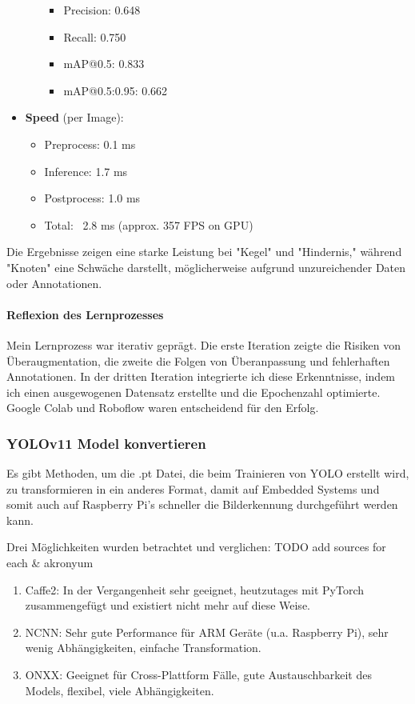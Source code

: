\begin{itemize}
\begin{itemize}
\begin{itemize}
            \item Precision: 0.648
            \item Recall: 0.750
            \item mAP@0.5: 0.833
            \item mAP@0.5:0.95: 0.662
        \end{itemize}
    \end{itemize}
    \item \textbf{Speed} (per Image):
    \begin{itemize}
        \item Preprocess: 0.1 ms
        \item Inference: 1.7 ms
        \item Postprocess: 1.0 ms
        \item Total: ~2.8 ms (approx. 357 FPS on GPU)
    \end{itemize}
\end{itemize}


Die Ergebnisse zeigen eine starke Leistung bei "Kegel" und "Hindernis," während "Knoten" eine Schwäche darstellt, möglicherweise aufgrund unzureichender Daten oder Annotationen.

\paragraph{Reflexion des Lernprozesses}

Mein Lernprozess war iterativ geprägt. Die erste Iteration zeigte die Risiken von Überaugmentation, die zweite die Folgen von Überanpassung und fehlerhaften Annotationen. In der dritten Iteration integrierte ich diese Erkenntnisse, indem ich einen ausgewogenen Datensatz erstellte und die Epochenzahl optimierte. Google Colab und Roboflow waren entscheidend für den Erfolg.







\subsubsection{YOLOv11 Model konvertieren}
\label{convert-yolo}

Es gibt Methoden, um die .pt Datei, die beim Trainieren von YOLO erstellt wird, zu transformieren in ein anderes Format, damit auf Embedded Systems und somit auch auf Raspberry Pi's schneller die Bilderkennung durchgeführt werden kann.

Drei Möglichkeiten wurden betrachtet und verglichen:
TODO add sources for each \& akronyum
\begin{enumerate}
    \item Caffe2: In der Vergangenheit sehr geeignet, heutzutages mit PyTorch zusammengefügt und existiert nicht mehr auf diese Weise.
    \item NCNN: Sehr gute Performance für ARM Geräte (u.a. Raspberry Pi), sehr wenig Abhängigkeiten, einfache Transformation.
    \item ONXX: Geeignet für  Cross-Plattform Fälle, gute Austauschbarkeit des Models, flexibel, viele Abhängigkeiten.
\end{enumerate}

